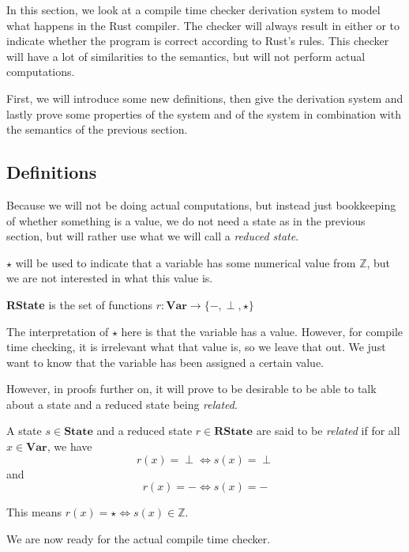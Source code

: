 In this section, we look at a compile time checker derivation system to model what happens in the Rust compiler. The checker will always result in either \tr or \fa to indicate whether the program is correct according to Rust's rules. This checker will have a lot of similarities to the semantics, but will not perform actual computations. 

First, we will introduce some new definitions, then give the derivation system and lastly prove some properties of the system and of the system in combination with the semantics of the previous section. 

\subsection{Definitions}

Because we will not be doing actual computations, but instead just bookkeeping of whether something is a value, we do not need a state as in the previous section, but will rather use what we will call a \emph{reduced state}. 

\begin{infdefinition}
$\star$ will be used to indicate that a variable has some numerical value from $\mathbb{Z}$, but we are not interested in what this value is.
\end{infdefinition}

\begin{definition}
\textbf{RState} is the set of functions $r: \textbf{Var} \to \{-, \perp, \star \}$
\end{definition}

The interpretation of $\star$ here is that the variable has a value. However, for compile time checking, it is irrelevant what that value is, so we leave that out. We just want to know that the variable has been assigned a certain value.

However, in proofs further on, it will prove to be desirable to be able to talk about a state and a reduced state being \emph{related}.

\begin{definition}
A state $s\in\textbf{State}$ and a reduced state $r\in\textbf{RState}$ are said to be \emph{related} if for all $x\in\textbf{Var}$, we have 
$$r(x) = \perp \iff s(x) = \perp$$
and
$$r(x) = - \iff s(x) = -$$
\end{definition}

This means $r(x) = \star \iff s(x)\in \mathbb{Z}$. 

We are now ready for the actual compile time checker.

